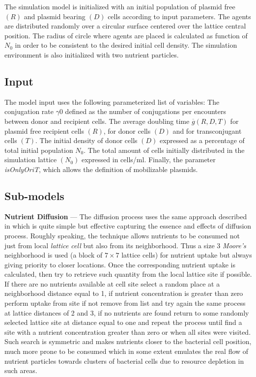 The simulation model is initialized with an initial population of plasmid free $(R)$ and plasmid bearing $(D)$ cells according to input parameters. The agents are distributed randomly over a circular surface centered over the lattice central position. The radius of circle where agents are placed is calculated as function of $N_0$ in order to be consistent to the desired initial cell density. The simulation environment is also initialized with two nutrient particles.


\subsection{Input}

The model input uses the following parameterized list of variables:  The conjugation rate $\gamma0$ defined as the number of conjugations per encounters between donor and recipient cells. The average doubling time $\overline{g}(R,D,T)$ for plasmid free recipient cells $(R)$, for donor cells $(D)$ and for transconjugant cells $(T)$. The initial density of donor cells $(D)$ expressed as a percentage of total initial population $N_0$. The total amount of cells initially distributed in the simulation lattice $(N_0)$ expressed in cells/ml. Finally, the parameter {\it isOnlyOriT}, which allows the definition of mobilizable plasmids.


\subsection{Sub-models}

{\bf Nutrient Diffusion} --- The diffusion process uses the same approach described in \cite{citeulike:3567840} which is quite simple but effective capturing the essence and effects of diffusion process.  Roughly speaking, the technique allows nutrients to be consumed not just from local {\it lattice cell} but also from its neighborhood. Thus a size 3 {\it Moore's} neighborhood is used (a block of $7\times7$ lattice cells) for nutrient uptake but always giving priority to closer locations. Once the corresponding nutrient uptake is calculated, then try to retrieve such quantity from the local lattice site if possible. If there are no nutrients available at cell site select a random place at a neighborhood distance equal to 1, if nutrient concentration is greater than zero perform uptake from site if not remove from list and try again the same process at lattice distances of 2 and 3, if no nutrients are found return to some randomly selected lattice site at distance equal to one and repeat the process until find a site with a nutrient concentration greater than zero or when all sites were visited.  Such search is symmetric and makes nutrients closer to the bacterial cell position, much more prone to be consumed which in some extent emulates the real flow of nutrient particles towards clusters of bacterial cells due to resource depletion in such areas\cite{citeulike:3567840}. 

